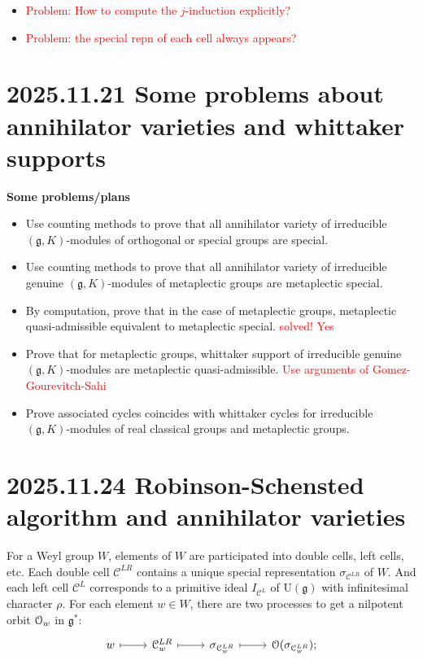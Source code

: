 \documentclass[12pt]{amsart}
\numberwithin{equation}{section}
\newcommand{\fg}{\mathfrak{g}} \newcommand{\fh}{\mathfrak{h}} \newcommand{\fk}{\mathfrak{k}}
\begin{document}
\begin{itemize}
  \item \textcolor{red}{Problem: How to compute the $j$-induction explicitly?}
  \item \textcolor{red}{Problem: the special repn of each cell always appears?}
\end{itemize}




\section{2025.11.21 Some problems about annihilator varieties and whittaker supports}
\textbf{Some problems/plans}
\begin{itemize}
  \item Use counting methods to prove that all annihilator variety of irreducible $(\fg,K)$-modules of orthogonal or special groups are special.
  \item Use counting methods to prove that all annihilator variety of irreducible genuine $(\fg,K)$-modules of metaplectic groups are metaplectic special.
  \item By computation, prove that in the case of metaplectic groups, metaplectic quasi-admissible equivalent to metaplectic special. \textcolor{red}{solved! Yes}
  \item Prove that for metaplectic groups, whittaker support of irreducible genuine $(\fg,K)$-modules are metaplectic quasi-admissible. \textcolor{red}{Use arguments of Gomez-Gourevitch-Sahi}
  \item Prove associated cycles coincides with whittaker cycles for irreducible $(\fg,K)$-modules of real classical groups and metaplectic groups.
\end{itemize}




\section{2025.11.24 Robinson-Schensted algorithm and annihilator varieties}
For a Weyl group $W$, elements of $W$ are participated into double cells, left cells, etc. Each double cell $\mathcal{C}^{LR}$ contains a unique special representation $\sigma_{\mathcal{C}^{LR}}$ of $W$. And each left cell $\mathcal{C}^L$ corresponds to a primitive ideal $I_{\mathcal{C}^L}$ of $\mathrm{U}(\fg)$ with infinitesimal character $\rho$.
For each element $w \in W$, there are two processes to get a nilpotent orbit ${\mathcal {O}}_w$ in $\fg^*$:
\[
  \begin{tikzcd}
    w \arrow[r,mapsto] & \mathcal{C}^{LR}_w \arrow[r,mapsto] & \sigma_{\mathcal{C}^{LR}_w} \arrow[r,mapsto] & \CO(\sigma_{\mathcal{C}^{LR}_w});
  \end{tikzcd}
\]
\end{document}

